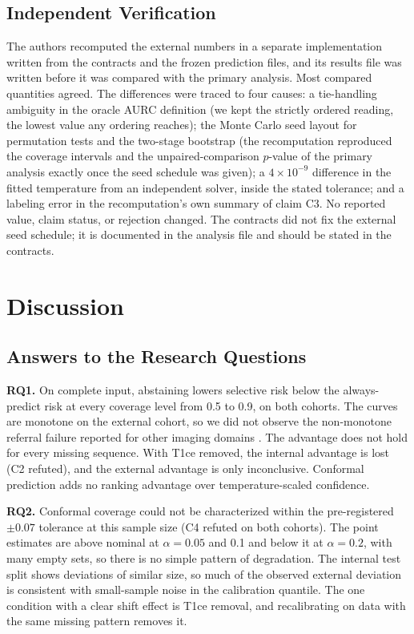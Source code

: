 \documentclass[journal]{IEEEtran}
\begin{document}
\subsection{Independent Verification}
\label{sec:verification}
The authors recomputed the external numbers in a separate implementation written from the contracts and the frozen prediction files, and its results file was written before it was compared with the primary analysis. Most compared quantities agreed. The differences were traced to four causes: a tie-handling ambiguity in the oracle AURC definition (we kept the strictly ordered reading, the lowest value any ordering reaches); the Monte Carlo seed layout for permutation tests and the two-stage bootstrap (the recomputation reproduced the coverage intervals and the unpaired-comparison $p$-value of the primary analysis exactly once the seed schedule was given); a $4\times10^{-9}$ difference in the fitted temperature from an independent solver, inside the stated tolerance; and a labeling error in the recomputation's own summary of claim C3. No reported value, claim status, or rejection changed. The contracts did not fix the external seed schedule; it is documented in the analysis file and should be stated in the contracts.

\section{Discussion}
\label{sec:discussion}

\subsection{Answers to the Research Questions}
\textbf{RQ1.} On complete input, abstaining lowers selective risk below the always-predict risk at every coverage level from 0.5 to 0.9, on both cohorts. The curves are monotone on the external cohort, so we did not observe the non-monotone referral failure reported for other imaging domains \cite{srivastava2023}. The advantage does not hold for every missing sequence. With T1ce removed, the internal advantage is lost (C2 refuted), and the external advantage is only inconclusive. Conformal prediction adds no ranking advantage over temperature-scaled confidence.

\textbf{RQ2.} Conformal coverage could not be characterized within the pre-registered $\pm0.07$ tolerance at this sample size (C4 refuted on both cohorts). The point estimates are above nominal at $\alpha=0.05$ and 0.1 and below it at $\alpha=0.2$, with many empty sets, so there is no simple pattern of degradation. The internal test split shows deviations of similar size, so much of the observed external deviation is consistent with small-sample noise in the calibration quantile. The one condition with a clear shift effect is T1ce removal, and recalibrating on data with the same missing pattern removes it.
\end{document}
